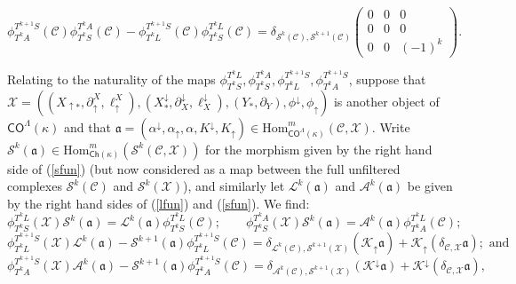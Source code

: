 \documentclass[11pt]{amsart}
\theoremstyle{definition}
\theoremstyle{remark}
\numberwithin{equation}{section}
\begin{document}
\begin{equation}\label{ssdiff}
	\phi^{T^{k+1}S}_{T^{k}A}(\mathcal{C})\phi_{T^kS}^{T^{k}A}(\mathcal{C})-	\phi^{T^{k+1}S}_{T^{k}L}(\mathcal{C})\phi_{T^kS}^{T^{k}L}(\mathcal{C})=\delta_{\mathcal{S}^{k}(\mathcal{C}),\mathcal{S}^{k+1}(\mathcal{C})}\left(\begin{array}{ccc} 0 & 0 & 0 \\ 0 &  0 & 0 \\ 0 & 0 & (-1)^k \end{array}\right).
	\end{equation}
	
	
	
Relating to the naturality of the maps $\phi_{T^kS}^{T^{k}L},\phi_{T^kS}^{T^kA},\phi_{T^kL}^{T^{k+1}S},\phi_{T^kA}^{T^{k+1}S}$, suppose that $\mathcal{X}=\left((X_{\uparrow *},\partial_{\uparrow}^X,\ell_{\uparrow}^{X}),(X^{\downarrow}_{*},\partial^{\downarrow}_{X},\ell^{\downarrow}_{X}),(Y_*,\partial_Y),\phi^{\downarrow},\phi_{\uparrow}\right)$ is another object of $\mathsf{CO}^{\Lambda}(\kappa)$ and that $\mathfrak{a}=(\alpha^{\downarrow},\alpha_{\uparrow},\alpha,K^{\downarrow},K_{\uparrow})\in \mathrm{Hom}_{\mathsf{CO}^{\Lambda}(\kappa)}^{m}(\mathcal{C},\mathcal{X})$.  Write $\mathcal{S}^k(\mathfrak{a})\in \mathrm{Hom}_{\mathsf{Ch}(\kappa)}^{m}(\mathcal{S}^k(\mathcal{C},\mathcal{X}))$ for the morphism given by the right hand side of (\ref{sfun}) (but now considered as a map between the full unfiltered complexes $\mathcal{S}^k(\mathcal{C})$ and $\mathcal{S}^k(\mathcal{X})$), and similarly let  $\mathcal{L}^k(\mathfrak{a})$ and $\mathcal{A}^k(\mathfrak{a})$ be given  by the right hand sides of (\ref{lfun}) and (\ref{sfun}).  We find: 
\begin{equation}\label{natkk}
	\phi_{T^kS}^{T^kL}(\mathcal{X})\mathcal{S}^k(\mathfrak{a})=\mathcal{L}^k(\mathfrak{a})\phi_{T^kS}^{T^kL}(\mathcal{C});\qquad 	\phi_{T^kS}^{T^kA}(\mathcal{X})\mathcal{S}^k(\mathfrak{a})=\mathcal{A}^k(\mathfrak{a})\phi_{T^kA}^{T^kL}(\mathcal{C});
\end{equation}
\begin{equation}\label{lsnat}
	\phi_{T^kL}^{T^{k+1}S}(\mathcal{X})\mathcal{L}^k(\mathfrak{a})-\mathcal{S}^{k+1}(\mathfrak{a})\phi_{T^kL}^{T^{k+1}S}(\mathcal{C})=\delta_{\mathcal{L}^{k}(\mathcal{C}),\mathcal{S}^{k+1}(\mathcal{X})}(\mathcal{K}_{\uparrow}\mathfrak{a})+\mathcal{K}_{\uparrow}(\delta_{\mathcal{C},\mathcal{X}}\mathfrak{a});\mbox{ and}
\end{equation}
\begin{equation}\label{asnat}
	\phi_{T^kA}^{T^{k+1}S}(\mathcal{X})\mathcal{A}^k(\mathfrak{a})-\mathcal{S}^{k+1}(\mathfrak{a})\phi_{T^kA}^{T^{k+1}S}(\mathcal{C})=\delta_{\mathcal{A}^{k}(\mathcal{C}),\mathcal{S}^{k+1}(\mathcal{X})}(\mathcal{K}^{\downarrow}\mathfrak{a})+\mathcal{K}^{\downarrow}(\delta_{\mathcal{C},\mathcal{X}}\mathfrak{a}),
\end{equation}
\end{document}
